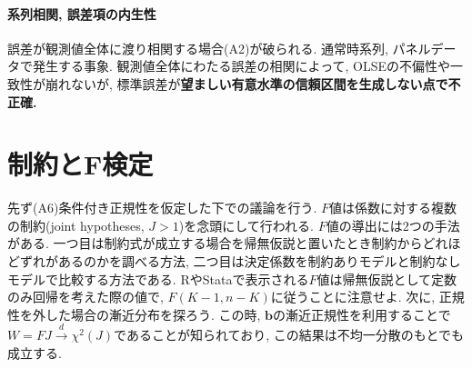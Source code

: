 \documentclass[paper=a4paper,fontsize=10pt]{jlreq}
\begin{document}
\paragraph{系列相関, 誤差項の内生性}
誤差が観測値全体に渡り相関する場合(A2)が破られる. 通常時系列, パネルデータで発生する事象. 観測値全体にわたる誤差の相関によって, OLSEの不偏性や一致性が崩れないが, 標準誤差が\rmfamily\mcfamily\bfseries{望ましい有意水準の信頼区間を生成しない}\mdseries 点で不正確.\\

\section{制約とF検定}
先ず(A6)条件付き正規性を仮定した下での議論を行う. $F$値は係数に対する複数の制約(joint hypotheses, $J>1$)を念頭にして行われる. $F$値の導出には$2$つの手法がある. 一つ目は制約式が成立する場合を帰無仮説と置いたとき制約からどれほどずれがあるのかを調べる方法, 二つ目は決定係数を制約ありモデルと制約なしモデルで比較する方法である. RやStataで表示される$F$値は帰無仮説として定数のみ回帰を考えた際の値で, $F(K-1, n-K)$に従うことに注意せよ. 次に, 正規性を外した場合の漸近分布を探ろう. この時, $\mathbf{b}$の漸近正規性を利用することで$W=F J\overset{d}{\to}\chi ^2(J)$であることが知られており, この結果は不均一分散のもとでも成立する.\\
\end{document}
